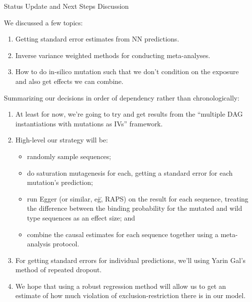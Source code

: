 \begin{Minutes}{Status Update and Next Steps Discussion}
\maketitle
We discussed a few topics:
\begin{enumerate}
    \item Getting standard error estimates from NN predictions.
    \item Inverse variance weighted methods for conducting meta-analyses.
    \item How to do in-silico mutation such that we don't condition on the exposure and also get effects we can combine.
\end{enumerate}

Summarizing our decisions in order of dependency rather than chronologically:
\begin{enumerate}
    \item At least for now, we're going to try and get results from the ``multiple DAG instantiations with mutations as IVs'' framework.
    \item High-level our strategy will be:
        \begin{itemize}
            \item randomly sample sequences;
            \item do saturation mutagenesis for each, getting a standard error for each mutation's prediction;
            \item run Egger (or similar, e\.g\., RAPS) on the result for each sequence, treating the difference between the binding probability for the mutated and wild type sequences as an effect size; and
            \item combine the causal estimates for each sequence together using a meta-analysis protocol.
        \end{itemize}
    \item For getting standard errors for individual predictions, we'll using Yarin Gal's method of repeated dropout.
    \item We hope that using a robust regression method will allow us to get an estimate of how much violation of exclusion-restriction there is in our model.
\end{enumerate}


\end{Minutes}

